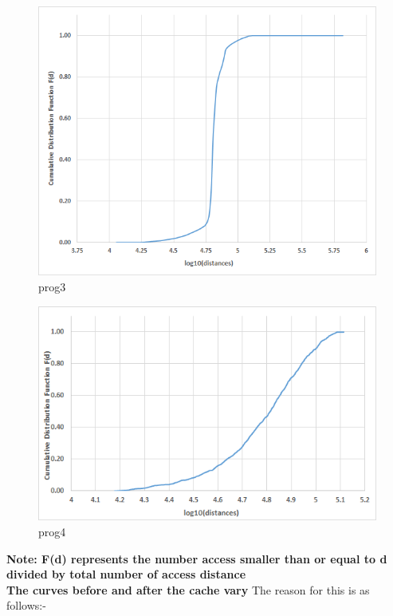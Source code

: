 \documentclass[12pt,oneside,reqno]{amsart}
\begin{document}
\bigskip
    \begin{figure}[h]
    \centering
		\includegraphics[scale=1.1]{q3_prog3.png}
    	\caption{prog3}
    	\end{figure}


 \newpage
  \begin{figure}[h]
\centering
	\includegraphics[scale=1.1]{q3_prog4.png}
	\caption{prog4}
	\end{figure}

\textbf{Note: F(d) represents the number access smaller than or equal to d divided by total number of access distance }\\

\textbf{The curves before and after the cache vary} The reason for this is as follows:-\\
\end{document}
